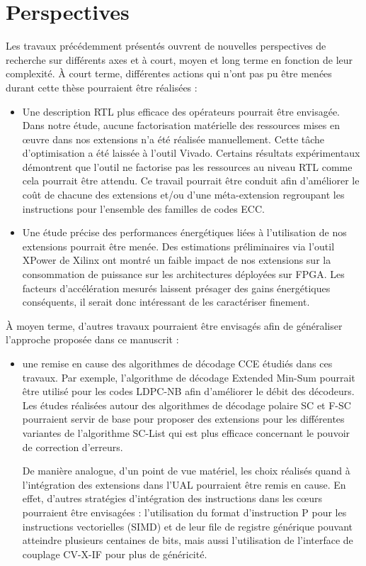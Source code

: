 \documentclass[../main.tex]{subfiles}
\begin{document}
% 
% 
% 
\section*{Perspectives}
% 
% 
% 
Les travaux précédemment présentés ouvrent de nouvelles perspectives de recherche sur différents axes et à court, moyen et long terme en fonction de leur complexité.
À court terme, différentes actions qui n’ont pas pu être menées durant cette thèse pourraient être réalisées :

\begin{itemize}

\item Une description RTL plus efficace des opérateurs pourrait être envisagée. Dans notre étude, aucune factorisation matérielle des ressources mises en œuvre dans nos extensions n’a été réalisée manuellement.
Cette tâche d’optimisation a été laissée à l’outil Vivado.
Certains résultats expérimentaux démontrent que l’outil ne factorise pas les ressources au niveau RTL comme cela pourrait être attendu.
Ce travail pourrait être conduit afin d’améliorer le coût de chacune des extensions et/ou d’une méta-extension regroupant les instructions pour l’ensemble des familles de codes ECC.

\item Une étude précise des performances énergétiques liées à l’utilisation de nos extensions pourrait être menée. 
Des estimations préliminaires via l’outil XPower de Xilinx ont montré un faible impact de nos extensions sur la consommation de puissance sur les architectures déployées sur FPGA.
Les facteurs d’accélération mesurés laissent présager des gains énergétiques conséquents, il serait donc intéressant de les caractériser finement.

\end{itemize}

À moyen terme, d’autres travaux pourraient être envisagés afin de généraliser l’approche proposée dans ce manuscrit :

\begin{itemize}

\item une remise en cause des algorithmes de décodage CCE étudiés dans ces travaux.
Par exemple, l’algorithme de décodage Extended Min-Sum pourrait être utilisé pour les codes LDPC-NB afin d’améliorer le débit des décodeurs. 
Les études réalisées autour des algorithmes de décodage polaire SC et F-SC pourraient servir de base pour proposer des extensions pour les différentes variantes de l’algorithme SC-List qui est plus efficace concernant le pouvoir de correction d’erreurs.

De manière analogue, d’un point de vue matériel, les choix réalisés quand à l’intégration des extensions dans l’UAL pourraient être remis en cause.
En effet, d’autres stratégies d’intégration des instructions dans les cœurs pourraient être envisagées : l’utilisation du format d’instruction P pour les instructions vectorielles (SIMD) et de leur file de registre générique pouvant atteindre plusieurs centaines de bits, mais aussi l’utilisation de l’interface de couplage CV-X-IF \cite{cvix} pour plus de généricité.

\end{itemize}
\end{document}
